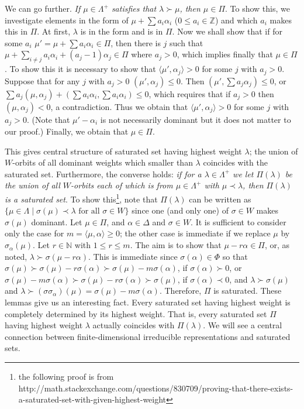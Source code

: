 \documentclass{article}
\newcommand{\NaN}{\mathbb{N}}
\newcommand{\InZ}{\mathbb{Z}}
\newcommand{\SBar}{\;|\;}
\begin{document}
We can go further.
\textit{If $\mu \in \Lambda^+$ satisfies that $\lambda \succ \mu$, then $\mu \in \Pi$}.
To show this, we investigate elements in the form of $\mu + \sum a_i \alpha_i$ ($0 \le a_i \in \InZ$) and which $a_i$ makes this in $\Pi$.
At first, $\lambda$ is in the form and is in $\Pi$.
Now we shall show that if for some $a_i$ $\mu' = \mu + \sum a_i \alpha_i \in \Pi$, then there is $j$ such that $\mu + \sum_{i \ne j} a_i \alpha_i + (a_j - 1) \alpha_j \in \Pi$ where $a_j > 0$, which implies finally that $\mu \in \Pi$.
To show this it is necessary to show that $\langle \mu', \alpha_j \rangle > 0$ for some $j$ with $a_j > 0$.
Suppose that for any $j$ with $a_j > 0$ $(\mu', \alpha_j) \le 0$.
Then $(\mu', \sum a_j \alpha_j) \le 0$, or $\sum a_j (\mu, \alpha_j) + (\sum a_i \alpha_i, \sum a_i \alpha_i) \le 0$, which requires that if $a_j > 0$ then $(\mu, \alpha_j) < 0$, a contradiction.
Thus we obtain that $\langle \mu', \alpha_j \rangle > 0$ for some $j$ with $a_j > 0$.
(Note that $\mu' - \alpha_i$ is not necessarily dominant but it does not matter to our proof.)
Finally, we obtain that $\mu \in \Pi$.

This gives central structure of saturated set having highest weight $\lambda$; the union of $W$-orbits of all dominant weights which smaller than $\lambda$ coincides with the saturated set.
Furthermore, the converse holds: \textit{if for a $\lambda \in \Lambda^+$ we let $\Pi(\lambda)$ be the union of all $W$-orbits each of which is from $\mu \in \Lambda^+$ with $\mu \prec \lambda$, then $\Pi(\lambda)$ is a saturated set}.
To show this\footnote{the following proof is from http://math.stackexchange.com/questions/830709/proving-that-there-exists-a-saturated-set-with-given-highest-weight}, note that $\Pi(\lambda)$ can be written as $\{\mu \in \Lambda \SBar \sigma(\mu) \prec \lambda \textrm{ for all $\sigma \in W$}\}$ since one (and only one) of $\sigma \in W$ makes $\sigma(\mu)$ dominant.
Let $\mu \in \Pi$, and $\alpha \in \Delta$ and $\sigma \in W$.
It is sufficient to consider only the case for $m = \langle \mu, \alpha \rangle \ge 0$; the other case is immediate if we replace $\mu$ by $\sigma_\alpha(\mu)$.
Let $r \in \NaN$ with $1 \le r \le m$.
The aim is to show that $\mu - r\alpha \in \Pi$, or, as noted, $\lambda \succ \sigma(\mu - r\alpha)$.
This is immediate since $\sigma(\alpha) \in \Phi$ so that $\sigma(\mu) \succ \sigma(\mu) - r\sigma(\alpha) \succ \sigma(\mu) - m\sigma(\alpha)$, if $\sigma(\alpha) \succ 0$, or $\sigma(\mu) - m\sigma(\alpha) \succ \sigma(\mu) - r\sigma(\alpha) \succ \sigma(\mu)$, if $\sigma(\alpha) \prec 0$, and $\lambda \succ \sigma(\mu)$ and $\lambda \succ (\sigma \sigma_\alpha)(\mu) = \sigma(\mu) - m\sigma(\alpha)$.
Therefore, $\Pi$ is saturated.
These lemmas give us an interesting fact.
Every saturated set having highest weight is completely determined by its highest weight.
That is, every saturated set $\Pi$ having highest weight $\lambda$ actually coincides with $\Pi(\lambda)$.
We will see a central connection between finite-dimensional irreducible representations and saturated sets.
\end{document}
